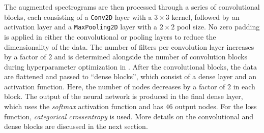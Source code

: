 The augmented spectrograms are then processed through a series of convolutional blocks, each consisting of a \texttt{Conv2D} layer with a $3 \times 3$ kernel, followed by 
an activation layer and a \texttt{MaxPooling2D} layer with a $2 \times 2$ pool size. No zero padding is applied in either the convolutional or pooling layers to reduce the 
dimensionality of the data. The number of filters per convolution layer increases by a factor of $2$ and is determined alongside the number of convolution blocks 
during hyperparameter optimization in .
After the convolutional blocks, the data are flattened and passed to \enquote{dense blocks}, which consist of a dense layer 
and an activation function. Here, the number of nodes decreases by a factor of $2$ in each block. The output of the neural network is produced in the final dense layer, 
which uses the \textit{softmax} activation function and has $\num{46}$ output nodes. For the loss function, \textit{categorical crossentropy} is used. 
More details on the convolutional and dense blocks are discussed in the next section.

